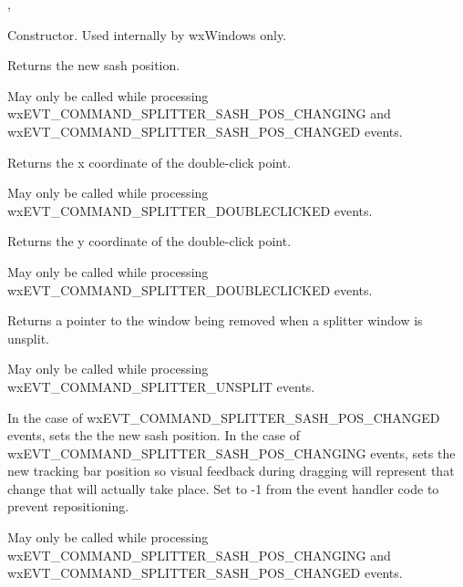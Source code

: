
,\rtfsp
{}




\label{wxsplittereventconstr}


Constructor. Used internally by wxWindows only.


\label{wxsplittereventgetsashposition}


Returns the new sash position.

May only be called while processing
wxEVT\_COMMAND\_SPLITTER\_SASH\_POS\_CHANGING and
wxEVT\_COMMAND\_SPLITTER\_SASH\_POS\_CHANGED events.


\label{wxsplittereventgetx}


Returns the x coordinate of the double-click point.

May only be called while processing
wxEVT\_COMMAND\_SPLITTER\_DOUBLECLICKED events.


\label{wxsplittereventgety}


Returns the y coordinate of the double-click point.

May only be called while processing
wxEVT\_COMMAND\_SPLITTER\_DOUBLECLICKED events.

\label{wxsplittereventgetwindowbeingremoved}


Returns a pointer to the window being removed when a splitter window
is unsplit.

May only be called while processing
wxEVT\_COMMAND\_SPLITTER\_UNSPLIT events.


\label{wxsplittereventsetsashposition}


In the case of wxEVT\_COMMAND\_SPLITTER\_SASH\_POS\_CHANGED events,
sets the the new sash position. In the case of
wxEVT\_COMMAND\_SPLITTER\_SASH\_POS\_CHANGING events, sets the new
tracking bar position so visual feedback during dragging will
represent that change that will actually take place. Set to -1 from
the event handler code to prevent repositioning.

May only be called while processing
wxEVT\_COMMAND\_SPLITTER\_SASH\_POS\_CHANGING and
wxEVT\_COMMAND\_SPLITTER\_SASH\_POS\_CHANGED events.



